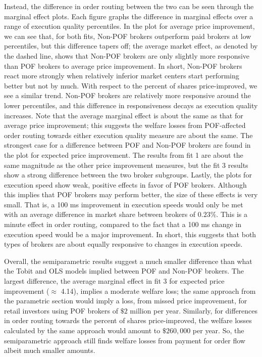 \documentclass[12pt,a4paper]{article}
\begin{document}
Instead, the difference in order routing between the two can be seen through the marginal effect plots. Each figure graphs the difference in marginal effects over a range of execution quality percentiles. In the plot for average price improvement, we can see that, for both fits, Non-POF brokers outperform paid brokers at low percentiles, but this difference tapers off; the average market effect, as denoted by the dashed line, shows that Non-POF brokers are only slightly more responsive than POF brokers to average price improvement. In short, Non-POF brokers react more strongly when relatively inferior market centers start performing better but not by much. With respect to the percent of shares price-improved, we see a similar trend.  Non-POF brokers are relatively more responsive around the lower percentiles, and this difference in responsiveness decays as execution quality increases. Note that the average marginal effect is about the same as that for average price improvement; this suggests the welfare losses from POF-affected order routing towards either execution quality measure are about the same. The strongest case for a difference between POF and Non-POF brokers are found in the plot for expected price improvement. The results from fit 1 are about the same magnitude as the other price improvement measures, but the fit 3 results show a strong difference between the two broker subgroups. Lastly, the plots for execution speed show weak, positive effects in favor of POF brokers. Although this implies that POF brokers may perform better, the size of these effects is very small. That is, a 100 ms improvement in execution speeds would only be met with an average difference in market share between brokers of $0.23\%$. This is a minute effect in order routing, compared to the fact that a 100 ms change in execution speed would be a major improvement. In short, this suggests that both types of brokers are about equally responsive to changes in execution speeds.

Overall, the semiparametric results suggest a much smaller difference than what the Tobit and OLS models implied between POF and Non-POF brokers. The largest difference, the average marginal effect in fit 3 for expected price improvement ($\approx$ 4.14), implies a moderate welfare loss; the same approach from the parametric section would imply a loss, from missed price improvement, for retail investors using POF brokers of $\$2$ million per year. Similarly, for differences in order routing towards the percent of shares price-improved, the welfare losses calculated by the same approach would amount to $\$260,000$ per year. So, the semiparametric approach still finds welfare losses from payment for order flow albeit much smaller amounts. 
\end{document}
